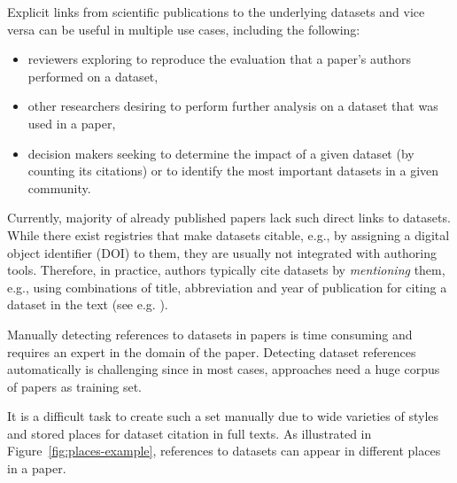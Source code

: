 \documentclass{IOS-Book-Article}
\begin{document}
Explicit links from scientific publications to the underlying datasets and vice versa can be useful in multiple use cases, including the following:
\begin{itemize}
	\item reviewers exploring to reproduce the evaluation that a paper's authors performed on a dataset, 
	\item other researchers desiring to perform further analysis on a dataset that was used in a paper,
        \item decision makers seeking to determine the impact of a given dataset (by counting its citations) or to identify the most important datasets in a given community.
\end{itemize}%

Currently, majority of already published papers lack such direct links to datasets.
While there exist registries that make datasets citable, e.g., by assigning a digital object identifier (DOI) to them, they are usually not integrated with authoring tools.
Therefore, in practice, authors typically cite datasets by \emph{mentioning} them, e.g., using  
combinations of title, abbreviation and year of publication for citing a dataset in the text (see e.g. \citet{Mathiak2015}).  

Manually detecting references to datasets in papers is time consuming and requires an expert in the domain of the paper. 
Detecting dataset references automatically is challenging since in most cases, approaches need a huge corpus of papers as training set. 

It is a difficult task to create such a set manually due to wide varieties of styles and stored places for dataset citation in full texts. 
As illustrated in Figure~\ref{fig:places-example}, references to datasets can appear in different places in a paper.   
\end{document}
